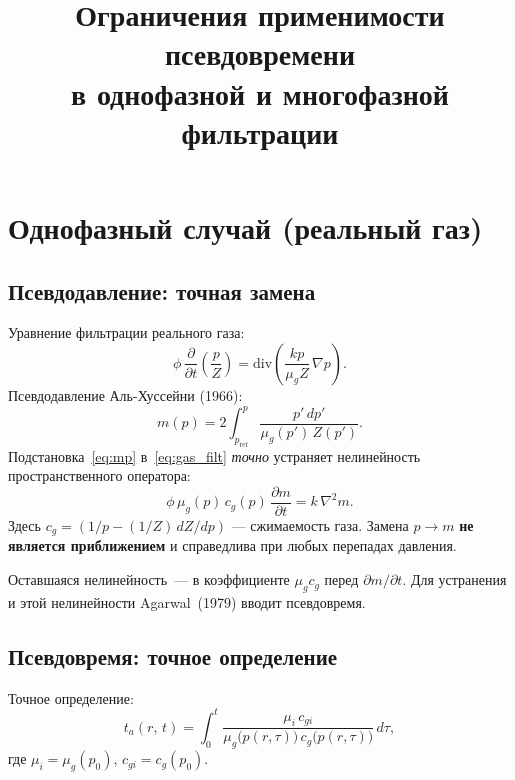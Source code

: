 \documentclass[12pt,a4paper]{article}
\title{Ограничения применимости псевдовремени\\
в однофазной и многофазной фильтрации}
\author{}
\date{}
\begin{document}
\maketitle

\section{Однофазный случай (реальный газ)}\label{sec:1ph}

\subsection{Псевдодавление: точная замена}\label{ssec:mp_exact}

Уравнение фильтрации реального газа:
\begin{equation}\label{eq:gas_filt}
  \phi\,\frac{\partial}{\partial t}\left(\frac{p}{Z}\right)
  = \mathrm{div}\left(\frac{kp}{\mu_g Z}\,\nabla p\right).
\end{equation}
Псевдодавление Аль-Хуссейни (1966):
\begin{equation}\label{eq:mp}
  m(p) = 2\int_{p_{\mathrm{ref}}}^{p}\frac{p'\,dp'}{\mu_g(p')\,Z(p')}.
\end{equation}
Подстановка~\eqref{eq:mp} в~\eqref{eq:gas_filt} \emph{точно}
устраняет нелинейность пространственного оператора:
\begin{equation}\label{eq:gas_m}
  \phi\,\mu_g(p)\,c_g(p)\,\frac{\partial m}{\partial t}
  = k\,\nabla^2 m.
\end{equation}
Здесь $c_g = (1/p - (1/Z)\,dZ/dp)$ --- сжимаемость газа.
Замена $p \to m$ \textbf{не является приближением}
и справедлива при любых перепадах давления.

Оставшаяся нелинейность~--- в коэффициенте $\mu_g c_g$ перед
$\partial m/\partial t$. Для устранения и этой нелинейности
Agarwal~(1979) вводит псевдовремя.

\subsection{Псевдовремя: точное определение}\label{ssec:pt_exact}

Точное определение:
\begin{equation}\label{eq:ta_exact}
  t_a(r,\,t) = \int_0^t
  \frac{\mu_i\,c_{gi}}{\mu_g\bigl(p(r,\tau)\bigr)\,
        c_g\bigl(p(r,\tau)\bigr)}\,d\tau,
\end{equation}
где $\mu_i = \mu_g(p_0)$, $c_{gi} = c_g(p_0)$.
\end{document}
